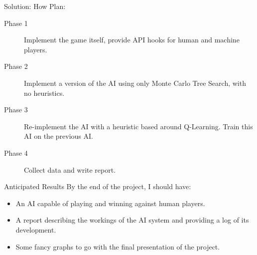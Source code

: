 \documentclass{beamer}
\begin{document}
\begin{frame}{Solution: How}
	Plan:
	\begin{description}
		\item[Phase 1] Implement the game itself, provide API hooks for human and machine players.
		\item[Phase 2] Implement a version of the AI using only Monte Carlo Tree Search, with no heuristics.
		\item[Phase 3] Re-implement the AI with a heuristic based around Q-Learning. Train this AI on the previous AI.
		\item[Phase 4] Collect data and write report.
	\end{description}
\end{frame}



\begin{frame}{Anticipated Results}
	By the end of the project, I should have:
	\begin{itemize}
		\item An AI capable of playing and winning against human players.
		\item A report describing the workings of the AI system and providing a log of its development.
		\item Some fancy graphs to go with the final presentation of the project.
	\end{itemize}
\end{frame}
\end{document}
